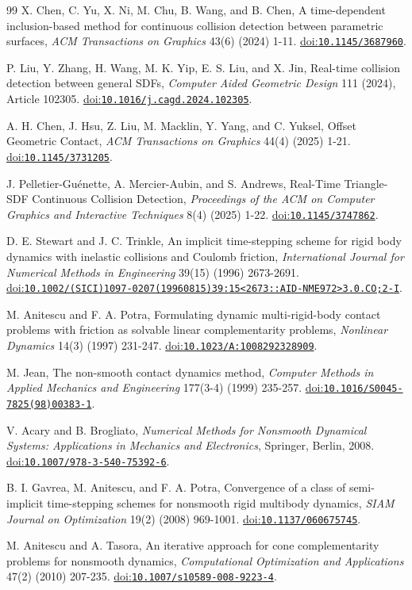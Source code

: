\documentclass[preprint,12pt]{elsarticle}
\newcommand{\doi}[1]{\href{https://doi.org/#1}{doi:\nolinkurl{#1}}}
\begin{document}
\begin{thebibliography}{99}
X. Chen, C. Yu, X. Ni, M. Chu, B. Wang, and B. Chen, A time-dependent inclusion-based method for continuous collision detection between parametric surfaces, \emph{ACM Transactions on Graphics} 43(6) (2024) 1-11. \doi{10.1145/3687960}.

P. Liu, Y. Zhang, H. Wang, M. K. Yip, E. S. Liu, and X. Jin, Real-time collision detection between general SDFs, \emph{Computer Aided Geometric Design} 111 (2024), Article 102305. \doi{10.1016/j.cagd.2024.102305}.

A. H. Chen, J. Hsu, Z. Liu, M. Macklin, Y. Yang, and C. Yuksel, Offset Geometric Contact, \emph{ACM Transactions on Graphics} 44(4) (2025) 1-21. \doi{10.1145/3731205}.

J. Pelletier-Gu\'{e}nette, A. Mercier-Aubin, and S. Andrews, Real-Time Triangle-SDF Continuous Collision Detection, \emph{Proceedings of the ACM on Computer Graphics and Interactive Techniques} 8(4) (2025) 1-22. \doi{10.1145/3747862}.

D. E. Stewart and J. C. Trinkle, An implicit time-stepping scheme for rigid body dynamics with inelastic collisions and Coulomb friction, \emph{International Journal for Numerical Methods in Engineering} 39(15) (1996) 2673-2691. \doi{10.1002/(SICI)1097-0207(19960815)39:15<2673::AID-NME972>3.0.CO;2-I}.

M. Anitescu and F. A. Potra, Formulating dynamic multi-rigid-body contact problems with friction as solvable linear complementarity problems, \emph{Nonlinear Dynamics} 14(3) (1997) 231-247. \doi{10.1023/A:1008292328909}.

M. Jean, The non-smooth contact dynamics method, \emph{Computer Methods in Applied Mechanics and Engineering} 177(3-4) (1999) 235-257. \doi{10.1016/S0045-7825(98)00383-1}.

V. Acary and B. Brogliato, \emph{Numerical Methods for Nonsmooth Dynamical Systems: Applications in Mechanics and Electronics}, Springer, Berlin, 2008. \doi{10.1007/978-3-540-75392-6}.

B. I. Gavrea, M. Anitescu, and F. A. Potra, Convergence of a class of semi-implicit time-stepping schemes for nonsmooth rigid multibody dynamics, \emph{SIAM Journal on Optimization} 19(2) (2008) 969-1001. \doi{10.1137/060675745}.

M. Anitescu and A. Tasora, An iterative approach for cone complementarity problems for nonsmooth dynamics, \emph{Computational Optimization and Applications} 47(2) (2010) 207-235. \doi{10.1007/s10589-008-9223-4}.


\end{thebibliography}
\end{document}
